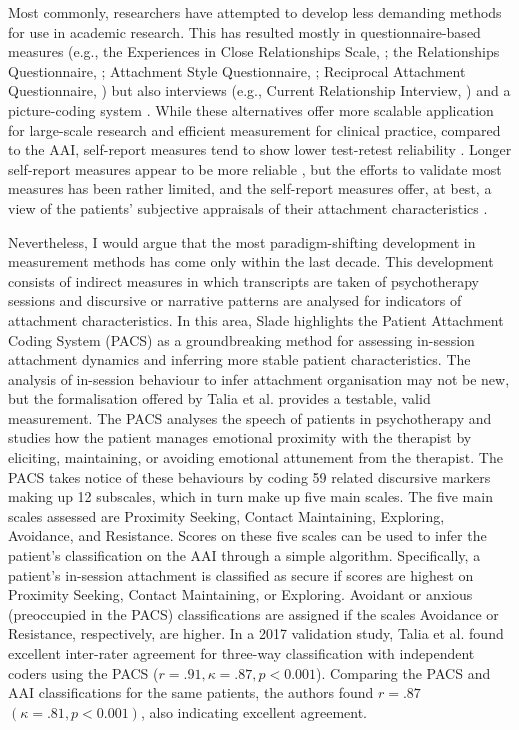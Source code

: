\documentclass[12pt]{report}
\begin{document}
Most commonly, researchers have attempted to develop less demanding methods for use in academic research.
This has resulted mostly in questionnaire-based measures (e.g., the Experiences in Close Relationships Scale, ; the Relationships Questionnaire, ; Attachment Style Questionnaire, ; Reciprocal Attachment Questionnaire, ) but also interviews (e.g., Current Relationship Interview, ) and a picture-coding system \cite{George2012}.
While these alternatives offer more scalable application for large-scale research and efficient measurement for clinical practice, compared to the AAI, self-report measures tend to show lower test-retest reliability \cite{Scharfe1994}.
Longer self-report measures appear to be more reliable , but the efforts to validate most measures has been rather limited, and the self-report measures offer, at best, a view of the patients' subjective appraisals of their attachment characteristics \cite{Talia2017}.

Nevertheless, I would argue that the most paradigm-shifting development in measurement methods has come only within the last decade.
This development consists of indirect measures in which transcripts are taken of psychotherapy sessions and discursive or narrative patterns are analysed for indicators of attachment characteristics.
In this area, Slade \citeyear{Slade2016} highlights the Patient Attachment Coding System (PACS) as a groundbreaking method for assessing in-session attachment dynamics and inferring more stable patient characteristics.
The analysis of in-session behaviour to infer attachment organisation may not be new, but the formalisation offered by Talia et al. \citeyear{Talia2017, Talia2014} provides a testable, valid measurement.
The PACS analyses the speech of patients in psychotherapy and studies how the patient manages emotional proximity with the therapist by eliciting, maintaining, or avoiding emotional attunement from the therapist.
The PACS takes notice of these behaviours by coding 59 related discursive markers making up 12 subscales, which in turn make up five main scales.
The five main scales assessed are Proximity Seeking, Contact Maintaining, Exploring, Avoidance, and Resistance.
Scores on these five scales can be used to infer the patient's classification on the AAI through a simple algorithm.
Specifically, a patient's in-session attachment is classified as secure if scores are highest on Proximity Seeking, Contact Maintaining, or Exploring.
Avoidant or anxious (preoccupied in the PACS) classifications are assigned if the scales Avoidance or Resistance, respectively, are higher.
In a 2017 validation study, Talia et al. \citeyear{Talia2017} found excellent inter-rater agreement for three-way classification with independent coders using the PACS ($r=.91, \kappa = .87, p<0.001$).
Comparing the PACS and AAI classifications for the same patients, the authors found $r=.87$ $(\kappa = .81, p<0.001)$, also indicating excellent agreement.
\end{document}
